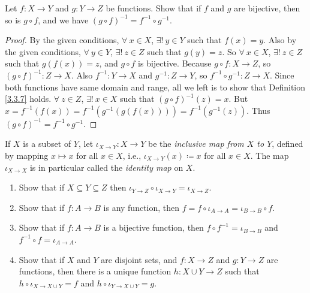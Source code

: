 \begin{exercise}\label{ex 3.3.7}
Let \(f : X \to Y\) and \(g : Y \to Z\) be functions.
Show that if \(f\) and \(g\) are bijective, then so is \(g \circ f\), and we have \((g \circ f)^{-1} = f^{-1} \circ g^{-1}\).
\end{exercise}

\begin{proof}
By the given conditions, \(\forall\ x \in X\), \(\exists!\ y \in Y\) such that \(f(x) = y\).
Also by the given conditions, \(\forall\ y \in Y\), \(\exists!\ z \in Z\) such that \(g(y) = z\).
So \(\forall\ x \in X\), \(\exists!\ z \in Z\) such that \(g(f(x)) = z\), and \(g \circ f\) is bijective.
Because \(g \circ f : X \to Z\), so \((g \circ f)^{-1} : Z \to X\).
Also \(f^{-1} : Y \to X\) and \(g^{-1} : Z \to Y\), so \(f^{-1} \circ g^{-1} : Z \to X\).
Since both functions have same domain and range, all we left is to show that Definition \ref{3.3.7} holds.
\(\forall\ z \in Z\), \(\exists!\ x \in X\) such that \((g \circ f)^{-1}(z) = x\).
But \(x = f^{-1}(f(x)) = f^{-1}(g^{-1}(g(f(x)))) = f^{-1}(g^{-1}(z))\).
Thus \((g \circ f)^{-1} = f^{-1} \circ g^{-1}\).
\end{proof}

\begin{exercise}\label{ex 3.3.8}
If \(X\) is a subset of \(Y\), let \(\iota_{X \to Y} : X \to Y\) be the \emph{inclusive map from \(X\) to \(Y\)}, defined by mapping \(x \mapsto x\) for all \(x \in X\), i.e., \(\iota_{X \to Y}(x) \coloneqq x\) for all \(x \in X\).
The map \(\iota_{X \to X}\) is in particular called the \emph{identity map} on \(X\).

    \begin{enumerate}
        \item Show that if \(X \subseteq Y \subseteq Z\) then \(\iota_{Y \to Z} \circ \iota_{X \to Y} = \iota_{X \to Z}\).
        \item Show that if \(f : A \to B\) is any function, then \(f = f \circ \iota_{A \to A} = \iota_{B \to B} \circ f\).
        \item Show that if \(f : A \to B\) is a bijective function, then \(f \circ f^{-1} = \iota_{B \to B}\) and \(f^{-1} \circ f = \iota_{A \to A}\).
        \item Show that if \(X\) and \(Y\) are disjoint sets, and \(f : X \to Z\) and \(g : Y \to Z\) are functions, then there is a unique function \(h : X \cup Y \to Z\) such that \(h \circ \iota_{X \to X \cup Y} = f\) and \(h \circ \iota_{Y \to X \cup Y} = g\).
    \end{enumerate}
\end{exercise}

